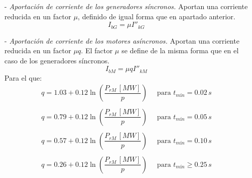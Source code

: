 \begin{itemize}
                        \begin{itemize}
                            \item[-] \textit{Aportación de corriente de los generadores síncronos.}
                                Aportan una corriente reducida en un factor $\mu$, definido de igual forma que en apartado anterior.
                                \begin{equation}
                                    I_\textit{bG} = \mu I''_\textit{kG}
                                \end{equation}
                            \item[-] \textit{Aportación de corriente de los motores asíncronos.}
                                Aportan una corriente reducida en un factor $\mu q$. El factor $\mu$ se define de la misma forma que en el caso de los generadores síncronos.
                                \begin{equation}
                                    I_\textit{bM} = \mu q I''_\textit{kM}
                                \end{equation}
                                Para el que:
                                \begin{equation}
                                    \begin{matrix}
                                        q = 1.03+0.12\ln\left(\dfrac{P_\textit{rM}\,[\textit{MW}]}{p}\right)\quad\text{ para }t_\textit{mín} = 0.02\,\textit{s}\\
                                        \\
                                        q = 0.79+0.12\ln\left(\dfrac{P_\textit{rM}\,[\textit{MW}]}{p}\right)\quad\text{ para }t_\textit{mín} = 0.05\,\textit{s}\\
                                        \\
                                        q = 0.57+0.12\ln\left(\dfrac{P_\textit{rM}\,[\textit{MW}]}{p}\right)\quad\text{ para }t_\textit{mín} = 0.10\,\textit{s}\\
                                        \\
                                        q = 0.26+0.12\ln\left(\dfrac{P_\textit{rM}\,[\textit{MW}]}{p}\right)\quad\text{ para }t_\textit{mín} \geq 0.25\,\textit{s}\\
                                        \\
                                        \end{matrix}

\end{equation}
\end{itemize}
\end{itemize}
